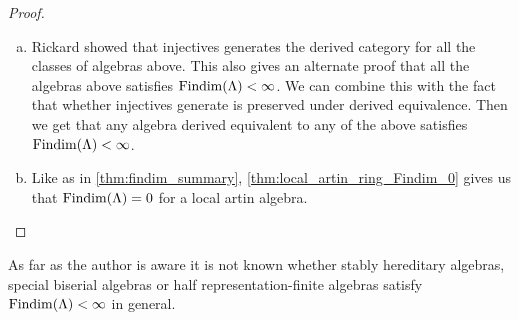 \begin{theorem}
\begin{proof}
\begin{enumerate}[(a)]
			\item\label{item:Findim_derived_equiv} Rickard showed that injectives generates the derived category for all the classes of algebras above\cite[Theoreom~3.2, Corollary~7.4-7.6]{Rick19}. This also gives an alternate proof that all the algebras above satisfies $\operatorname{Findim}(\Lambda) < \infty$. We can combine this with the fact that whether injectives generate is preserved under derived equivalence\cite[Theorem~3.4]{Rick19}. Then we get that any algebra derived equivalent to any of the above satisfies $\operatorname{Findim}(\Lambda) < \infty$.
			\item Like as in \cref{thm:findim_summary}, \cref{thm:local_artin_ring_Findim_0} gives us that $\operatorname{Findim}(\Lambda)=0$ for a local artin algebra.
		\end{enumerate}
	\end{proof}
\end{theorem}

As far as the author is aware it is not known whether stably hereditary algebras, special biserial algebras or half representation-finite algebras satisfy $\operatorname{Findim}(\Lambda) < \infty$ in general.



